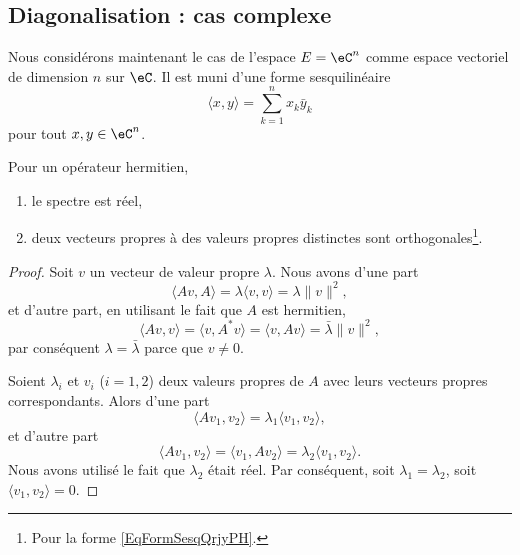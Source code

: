 \subsection{Diagonalisation : cas complexe}

Nous considérons maintenant le cas de l'espace \( E=\eC^n\) comme espace vectoriel de dimension \( n\) sur \( \eC\). Il est muni d'une forme sesquilinéaire
\begin{equation}    \label{EqFormSesqQrjyPH}
    \langle x, y\rangle =\sum_{k=1}^nx_k\bar y_k
\end{equation}
pour tout \( x,y\in\eC^n\).
\begin{lemma}
    Pour un opérateur hermitien,
    \begin{enumerate}
        \item
            le spectre est réel,
        \item
            deux vecteurs propres à des valeurs propres distinctes sont orthogonales\footnote{Pour la forme \eqref{EqFormSesqQrjyPH}.}.
    \end{enumerate}
\end{lemma}

\begin{proof}
    Soit \( v\) un vecteur de valeur propre \( \lambda\). Nous avons d'une part 
    \begin{equation}
        \langle Av, A\rangle =\lambda\langle v, v\rangle =\lambda\| v \|^2,
    \end{equation}
    et d'autre part, en utilisant le fait que \( A\) est hermitien,
    \begin{equation}
        \langle Av, v\rangle =\langle v, A^*v\rangle =\langle v, Av\rangle =\bar\lambda\| v \|^2,
    \end{equation}
    par conséquent \( \lambda=\bar\lambda\) parce que \( v\neq 0\).

    Soient \( \lambda_i\) et \( v_i\) (\( i=1,2\)) deux valeurs propres de \( A\) avec leurs vecteurs propres correspondants. Alors d'une part
    \begin{equation}
        \langle Av_1, v_2\rangle =\lambda_1\langle v_1, v_2\rangle ,
    \end{equation}
    et d'autre part
    \begin{equation}
        \langle Av_1, v_2\rangle =\langle v_1, Av_2\rangle =\lambda_2\langle v_1, v_2\rangle .
    \end{equation}
    Nous avons utilisé le fait que \( \lambda_2\) était réel. Par conséquent, soit \( \lambda_1=\lambda_2\), soit \( \langle v_1, v_2\rangle =0\).
\end{proof}

